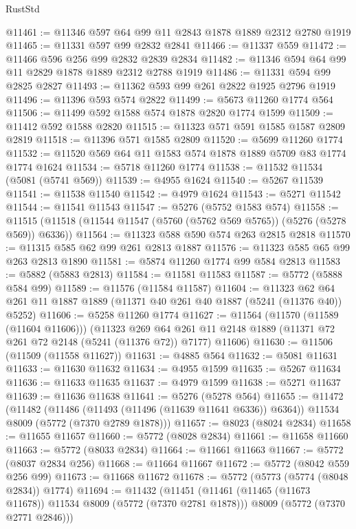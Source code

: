 \begin{lexlean}{RustStd}
\begin{coremodule}
{\begin{coremodule}
{{{{{{{{{{{{{{{{{{{{{{{{{{{{{@11461 := @11346 @597 @64 @99 @11 @2843 @1878 @1889 @2312 @2780 @1919
@11465 := @11331 @597 @99 @2832 @2841
@11466 := @11337 @559
@11472 := @11466 @596 @256 @99 @2832 @2839 @2834
@11482 := @11346 @594 @64 @99 @11 @2829 @1878 @1889 @2312 @2788 @1919
@11486 := @11331 @594 @99 @2825 @2827
@11493 := @11362 @593 @99 @261 @2822 @1925 @2796 @1919
@11496 := @11396 @593 @574 @2822
@11499 := @5673 @11260 @1774 @564
@11506 := @11499 @592 @1588 @574 @1878 @2820 @1774 @1599
@11509 := @11412 @592 @1588 @2820
@11515 := @11323 @571 @591 @1585 @1587 @2809 @2819
@11518 := @11396 @571 @1585 @2809
@11520 := @5699 @11260 @1774
@11532 := @11520 @569 @64 @11 @1583 @574 @1878 @1889 @5709 @83 @1774 @1774 @1624
@11534 := @5718 @11260 @1774
@11538 := @11532 @11534 (@5081 (@5741 @569))
@11539 := @4955 @1624
@11540 := @5267 @11539
@11541 := @11538 @11540
@11542 := @4979 @1624
@11543 := @5271 @11542
@11544 := @11541 @11543
@11547 := @5276 (@5752 @1583 @574)
@11558 := @11515 (@11518 (@11544 @11547 (@5760 (@5762 @569 @5765)) (@5276 (@5278 @569)) @6336))
@11564 := @11323 @588 @590 @574 @263 @2815 @2818
@11570 := @11315 @585 @62 @99 @261 @2813 @1887
@11576 := @11323 @585 @65 @99 @263 @2813 @1890
@11581 := @5874 @11260 @1774 @99 @584 @2813
@11583 := @5882 (@5883 @2813)
@11584 := @11581 @11583
@11587 := @5772 (@5888 @584 @99)
@11589 := @11576 (@11584 @11587)
@11604 := @11323 @62 @64 @261 @11 @1887 @1889 (@11371 @40 @261 @40 @1887 (@5241 (@11376 @40)) @5252)
@11606 := @5258 @11260 @1774
@11627 := @11564
    (@11570 (@11589 (@11604 @11606)))
    (@11323
      @269
      @64
      @261
      @11
      @2148
      @1889
      (@11371 @72 @261 @72 @2148 (@5241 (@11376 @72)) @7177)
      @11606)
@11630 := @11506 (@11509 (@11558 @11627))
@11631 := @4885 @564
@11632 := @5081 @11631
@11633 := @11630 @11632
@11634 := @4955 @1599
@11635 := @5267 @11634
@11636 := @11633 @11635
@11637 := @4979 @1599
@11638 := @5271 @11637
@11639 := @11636 @11638
@11641 := @5276 (@5278 @564)
@11655 := @11472
    (@11482
      (@11486 (@11493 (@11496 (@11639 @11641 @6336)) @6364))
      @11534
      @8009
      (@5772 (@7370 @2789 @1878)))
@11657 := @8023 (@8024 @2834)
@11658 := @11655 @11657
@11660 := @5772 (@8028 @2834)
@11661 := @11658 @11660
@11663 := @5772 (@8033 @2834)
@11664 := @11661 @11663
@11667 := @5772 (@8037 @2834 @256)
@11668 := @11664 @11667
@11672 := @5772 (@8042 @559 @256 @99)
@11673 := @11668 @11672
@11678 := @5772 (@5773 (@5774 (@8048 @2834)) @1774)
@11694 := @11432
    (@11451
      (@11461 (@11465 (@11673 @11678)) @11534 @8009 (@5772 (@7370 @2781 @1878)))
      @8009
      (@5772 (@7370 @2771 @2846)))
}}}}}}}}}}}}}}}}}}}}}}}}}}}}}
\end{coremodule}}
\end{coremodule}
\end{lexlean}

